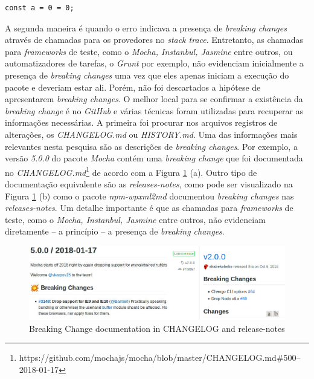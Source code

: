 \begin{lstlisting}[style=Javascript, label=cod:syntax:error, caption={Código com um \textit{Reference Error}}]
const a = 0 = 0;
\end{lstlisting}

A segunda maneira é quando o erro indicava a presença de \textit{breaking changes} através de chamadas para os provedores no \textit{stack trace}. Entretanto, as chamadas para \textit{frameworks} de teste, como o \textit{Mocha, Instanbul, Jasmine} entre outros, ou automatizadores de tarefas, o \textit{Grunt} por exemplo, não evidenciam inicialmente a presença de \textit{breaking changes} uma vez que eles apenas iniciam a execução do pacote e deveriam estar ali. Porém, não foi descartados a hipótese de apresentarem \textit{breaking changes}. O melhor local para se confirmar a existência da \textit{breaking change} é no \textit{GitHub} e várias técnicas foram utilizadas para recuperar as informações necessárias. A primeira foi procurar nos arquivos registros de alterações, os \textit{CHANGELOG.md} ou \textit{HISTORY.md}. Uma das informações mais relevantes nesta pesquisa são as descrições de \textit{breaking changes}. Por exemplo, a versão \textit{5.0.0} do pacote \textit{Mocha} contém uma \textit{breaking change} que foi documentada no \textit{CHANGELOG.md}\footnote{https://github.com/mochajs/mocha/blob/master/CHANGELOG.md\#500--2018-01-17} de acordo com a Figura \ref{fig:bc_documentation} (a). Outro tipo de documentação equivalente são as \textit{releases-notes}, como pode ser visualizado na Figura \ref{fig:bc_documentation} (b) como o pacote \textit{npm-wpxml2md} documentou \textit{breaking changes} nas \textit{releases-notes}. Um detalhe importante é que as chamadas para \textit{frameworks} de teste, como o \textit{Mocha, Instanbul, Jasmine} entre outros, não evidenciam diretamente -- a princípio -- a presença de \textit{breaking changes}.

\begin{figure}
    \centering
    \includegraphics[scale=0.45]{figuras/bc_documentation.jpeg}
    \caption{Breaking Change documentation in CHANGELOG and release-notes}
    \label{fig:bc_documentation}
\end{figure}{}

